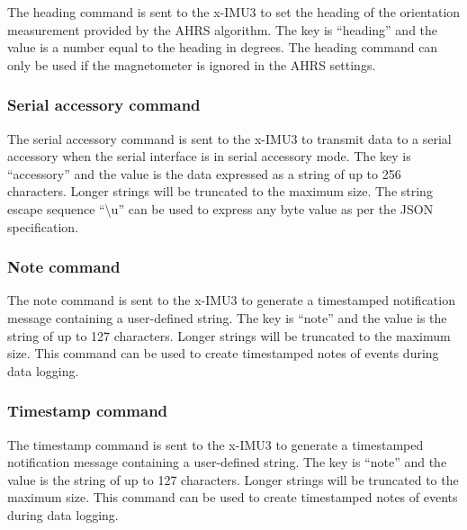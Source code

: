 The heading command is sent to the x-IMU3 to set the heading of the orientation measurement provided by the \ac{AHRS} algorithm.  The key is \enquote{heading} and the value is a number equal to the heading in degrees.  The heading command can only be used if the magnetometer is ignored in the \ac{AHRS} settings.


\subsubsection{Serial accessory command}

The serial accessory command is sent to the x-IMU3 to transmit data to a serial accessory when the serial interface is in serial accessory mode.  The key is \enquote{accessory} and the value is the data expressed as a string of up to 256 characters.  Longer strings will be truncated to the maximum size.  The string escape sequence \enquote{\textbackslash u} can be used to express any byte value as per the \ac{JSON} specification.


\subsubsection{Note command}

The note command is sent to the x-IMU3 to generate a timestamped notification message containing a user-defined string.  The key is \enquote{note} and the value is the string of up to 127 characters.  Longer strings will be truncated to the maximum size.  This command can be used to create timestamped notes of events during data logging.


\subsubsection{Timestamp command}

The timestamp command is sent to the x-IMU3 to generate a timestamped notification message containing a user-defined string.  The key is \enquote{note} and the value is the string of up to 127 characters.  Longer strings will be truncated to the maximum size.  This command can be used to create timestamped notes of events during data logging.

